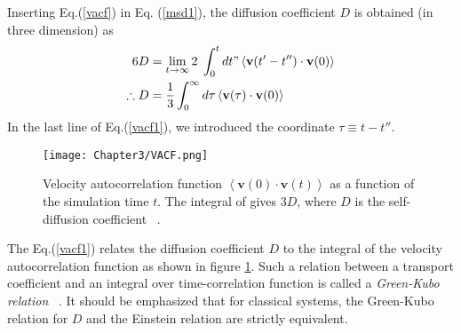    Inserting Eq.(\ref{vacf}) in Eq. (\ref{msd1}), the diffusion coefficient $D$ is obtained  (in three dimension) as 
     \begin{align}
       6 D &= \lim \limits_{t \to\infty} 2\;\int_0^{t} dt" \left\langle \mathbf{v}(t'-t'')\cdot \mathbf{v}(0) \right\rangle \nonumber\\
       \therefore D & = \frac{1}{3}\int_0^{\infty} d\tau \left\langle \mathbf{v}(\tau)\cdot \mathbf{v}(0) \right\rangle
       \label{vacf1}
       \end{align} 
   In the last line of Eq.(\ref{vacf1}), we introduced the coordinate $\tau \equiv t-t''$.  
   \begin{figure}[h!]
    \centering
    \texttt{[image: Chapter3/VACF.png]}
  \caption[Velocity autocorrelation function  as a function of the simulation time.]{Velocity autocorrelation function $\left\langle \mathbf{v}(0)\cdot \mathbf{v}(t) \right\rangle$   as a function of the simulation time $t$. The integral of   gives $3D$, where $D$ is the self-diffusion coefficient~ \citep{Frenkel2002}.} 
  \label{vacf2}
    \end{figure}     
 The Eq.(\ref{vacf1}) relates the diffusion coefficient $D$ to the integral of the velocity autocorrelation function as shown in figure \ref{vacf2}. Such a relation between a transport coefficient and an integral over time-correlation function is called a \textit{Green-Kubo relation}~ \citep{Allen1989, Frenkel2002}. It should be emphasized that for classical systems, the Green-Kubo relation for $D$ and the Einstein relation are strictly equivalent.            
 
 
